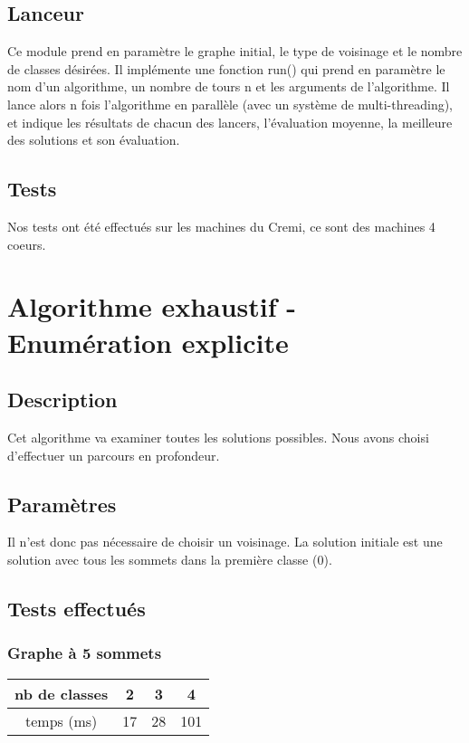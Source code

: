 \documentclass[12pt]{article}
\begin{document}
\subsection{Lanceur}

Ce module prend en paramètre le graphe initial, le type de voisinage et le nombre de classes désirées. Il implémente une fonction run() qui prend en paramètre le nom d’un algorithme, un nombre de tours n et les arguments de l’algorithme.
Il lance alors n fois l’algorithme en parallèle (avec un système de multi-threading), et indique les résultats de chacun des lancers, l’évaluation moyenne, la meilleure des solutions et son évaluation.

\subsection{Tests}

Nos tests ont été effectués sur les machines du Cremi, ce sont des machines 4 coeurs.

\newpage

\section{Algorithme exhaustif - Enumération explicite}
\subsection{Description}
Cet algorithme va examiner toutes les solutions possibles. Nous avons choisi d'effectuer un parcours en profondeur.

\subsection{Paramètres}
Il n’est donc pas nécessaire de choisir un voisinage. La solution initiale est une solution avec tous les sommets dans la première classe (0).

\subsection{Tests effectués}

\subsubsection{Graphe à 5 sommets}

\begin{tabular}{|c|c|c|c|}
	\hline 
	nb de classes & 2 & 3 & 4 \\
	\hline
	temps (ms) & 17 & 28 & 101 \\
	\hline
\end{tabular}
\end{document}
